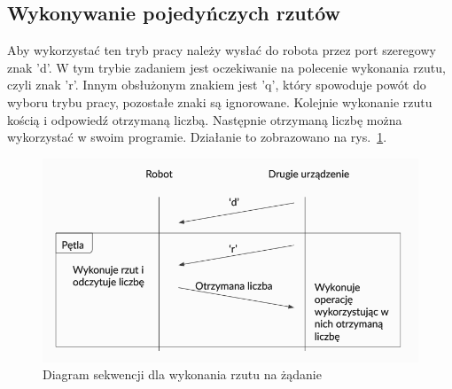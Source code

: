 \subsection{Wykonywanie pojedyńczych rzutów}
Aby wykorzystać ten tryb pracy należy wysłać do robota przez port szeregowy znak 'd'.
W tym trybie zadaniem jest oczekiwanie na polecenie wykonania rzutu, czyli znak 'r'.
Innym obsłużonym znakiem jest 'q', który spowoduje powót do wyboru trybu pracy, pozostałe znaki są ignorowane. %
Kolejnie wykonanie rzutu kością i odpowiedź otrzymaną liczbą. Następnie otrzymaną 
liczbę można wykorzystać w swoim programie. Działanie to zobrazowano na rys.~\ref{fig:interface_b}.

\begin{figure}[H]
    \centering
    \includegraphics[width=0.5\linewidth]{chapters/05-Przetwarzanie Wyniku/figures/InterfaceB}
    \caption{Diagram sekwencji dla wykonania rzutu na żądanie}
    \label{fig:interface_b}
\end{figure}

